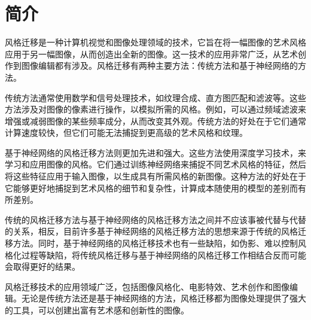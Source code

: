 \section{简介}

风格迁移是一种计算机视觉和图像处理领域的技术，它旨在将一幅图像的艺术风格应用于另一幅图像，从而创造出全新的图像。这一技术的应用非常广泛，从艺术创作到图像编辑都有涉及。风格迁移有两种主要方法：传统方法和基于神经网络的方法。

传统方法通常使用数学和信号处理技术，如纹理合成、直方图匹配和滤波等。这些方法涉及对图像的像素进行操作，以模拟所需的风格。例如，可以通过频域滤波来增强或减弱图像的某些频率成分，从而改变其外观。传统方法的好处在于它们通常计算速度较快，但它们可能无法捕捉到更高级的艺术风格和纹理。

基于神经网络的风格迁移方法则更加先进和强大。这些方法使用深度学习技术，来学习和应用图像的风格。它们通过训练神经网络来捕捉不同艺术风格的特征，然后将这些特征应用于输入图像，以生成具有所需风格的新图像。这种方法的好处在于它能够更好地捕捉到艺术风格的细节和复杂性，计算成本随使用的模型的差别而有所差别。

传统的风格迁移方法与基于神经网络的风格迁移方法之间并不应该事被代替与代替的关系，相反，目前许多基于神经网络的风格迁移方法的思想来源于传统的风格迁移方法。同时，基于神经网络的风格迁移技术也有一些缺陷，如伪影、难以控制风格化过程等缺陷，将传统风格迁移与基于神经网络的风格迁移工作相结合反而可能会取得更好的结果。

风格迁移技术的应用领域广泛，包括图像风格化、电影特效、艺术创作和图像编辑。无论是传统方法还是基于神经网络的方法，风格迁移都为图像处理提供了强大的工具，可以创建出富有艺术感和创新性的图像。
